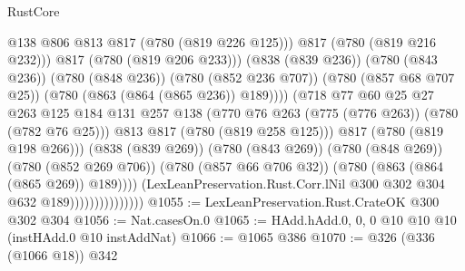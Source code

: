 \begin{lexlean}{RustCore}
\begin{coremodule}
                                                @138
                                                @806
                                                @813
                                                @817
                                                (@780 (@819 @226 @125)))
                                              @817
                                              (@780 (@819 @216 @232)))
                                            @817
                                            (@780 (@819 @206 @233)))
                                          (@838 (@839 @236))
                                          (@780 (@843 @236))
                                          (@780 (@848 @236))
                                          (@780 (@852 @236 @707))
                                          (@780 (@857 @68 @707 @25))
                                          (@780 (@863 (@864 (@865 @236)) @189))))
                                      (@718
                                        @77
                                        @60
                                        @25
                                        @27
                                        @263
                                        @125
                                        @184
                                        @131
                                        @257
                                        @138
                                        (@770 @76 @263 (@775 (@776 @263)) (@780 (@782 @76 @25)))
                                        @813
                                        @817
                                        (@780 (@819 @258 @125)))
                                      @817
                                      (@780 (@819 @198 @266)))
                                    (@838 (@839 @269))
                                    (@780 (@843 @269))
                                    (@780 (@848 @269))
                                    (@780 (@852 @269 @706))
                                    (@780 (@857 @66 @706 @32))
                                    (@780 (@863 (@864 (@865 @269)) @189))))
                                (LexLeanPreservation.Rust.Corr.lNil
                                  @300
                                  @302
                                  @304
                                  @632
                                  @189)))))))))))))))
@1055 := LexLeanPreservation.Rust.CrateOK @300 @302 @304
@1056 := Nat.casesOn.{0}
@1065 := HAdd.hAdd.{0, 0, 0} @10 @10 @10 (instHAdd.{0} @10 instAddNat)
@1066 := @1065 @386
@1070 := @326 (@336 (@1066 @18)) @342

\end{coremodule}
\end{lexlean}
